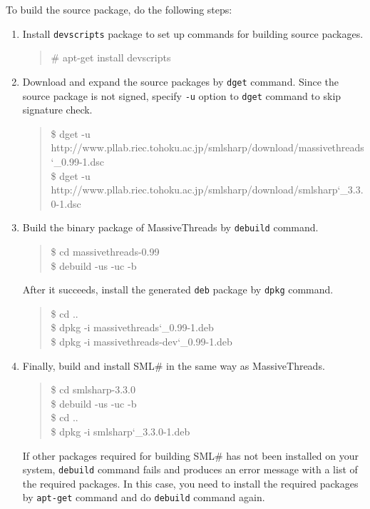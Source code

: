 \documentclass{jbook}
\newcommand{\smlsharp}{SML\#}
\newcommand{\version}{3.3.0}
\newenvironment{program}{\begin{quote}\begin{tt}}%
                        {\end{tt}\end{quote}}
\begin{document}
	To build the source package, do the following steps:
\begin{enumerate}
\item
	Install {\tt devscripts} package to set up commands for building
source packages.
\begin{program}
\# apt-get install devscripts
\end{program}
\item
	Download and expand the source packages by {\tt dget} command.
	Since the source package is not signed,
specify {\tt -u} option to {\tt dget} command to skip signature
check.
\begin{program}
\$ dget -u http://www.pllab.riec.tohoku.ac.jp/smlsharp/download/massivethreads\char`\_0.99-1.dsc\\
\$ dget -u http://www.pllab.riec.tohoku.ac.jp/smlsharp/download/smlsharp\char`\_\version-1.dsc
\end{program}
\item
	Build the binary package of MassiveThreads by {\tt debuild} command.
\begin{program}
\$ cd massivethreads-0.99\\
\$ debuild -us -uc -b
\end{program}
	After it succeeds, install the generated {\tt deb} package by
{\tt dpkg} command.
\begin{program}
\$ cd ..\\
\$ dpkg -i massivethreads\char`\_0.99-1.deb\\
\$ dpkg -i massivethreads-dev\char`\_0.99-1.deb
\end{program}

\item
	Finally, build and install \smlsharp{}
in the same way as MassiveThreads.
\begin{program}
\$ cd smlsharp-\version\\
\$ debuild -us -uc -b\\
\$ cd ..\\
\$ dpkg -i smlsharp\char`\_\version-1.deb
\end{program}
	If other packages required for building \smlsharp{} has not been
installed on your system, {\tt debuild} command fails and produces an error
message with a list of the required packages.
	In this case, you need to install the required packages by
{\tt apt-get} command and do {\tt debuild} command again.

\begin{program}
\end{program}
\end{enumerate}
\end{document}
